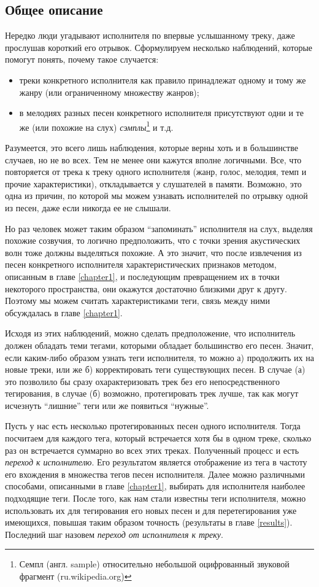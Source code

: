 \subsection{Общее описание}

Нередко люди угадывают исполнителя по впервые услышанному треку, даже прослушав короткий его отрывок.
Сформулируем несколько наблюдений, которые помогут понять, почему такое случается:
\begin{itemize}
 \item треки конкретного исполнителя как правило принадлежат одному и тому же жанру (или ограниченному множеству жанров);
 \item в мелодиях разных песен конкретного исполнителя присутствуют одни и те же (или похожие на слух) \emph{сэмплы}\footnote{Семпл (англ. sample) \ld 
 относительно небольшой оцифрованный звуковой фрагмент (ru.wikipedia.org)} и т.д.
\end{itemize}
Разумеется, это всего лишь наблюдения, которые верны хоть и в большинстве случаев, но не во всех. Тем не менее они кажутся вполне логичными.
Все, что повторяется от трека к треку одного исполнителя (жанр, голос, мелодия, темп и прочие характеристики), откладывается у слушателей в памяти.
Возможно, это одна из причин, по которой мы можем узнавать исполнителей по отрывку одной из песен, даже если никогда ее не слышали.

Но раз человек может таким образом ``запоминать'' исполнителя на слух, выделяя похожие созвучия, то логично предположить, что с точки зрения акустических волн тоже должны выделяться похожие.
А это значит, что после извлечения из песен конкретного исполнителя  характеристических признаков методом, описанным в главе \ref{chapter1}, 
и последующим превращением их в точки некоторого пространства, они окажутся достаточно близкими друг к другу. 
Поэтому мы можем считать характеристиками теги, связь между ними обсуждалась в главе \ref{chapter1}.

Исходя из этих наблюдений, можно сделать предположение, что исполнитель должен обладать теми тегами, которыми обладает большинство его песен.
Значит, если каким-либо образом узнать теги исполнителя, то можно а) продолжить их на новые треки, или же б) корректировать теги существующих песен.
В случае (а) это позволило бы сразу охарактеризовать трек без его непосредственного тегирования, в случае (б) \ld возможно, 
протегировать трек лучше, так как могут исчезнуть ``лишние'' теги или же появиться ``нужные''.

Пусть у нас есть несколько протегированных песен одного исполнителя. Тогда посчитаем для каждого тега, который встречается хотя бы в одном треке, сколько раз он встречается суммарно во всех этих треках.
Полученный процесс и есть \emph{переход к исполнителю}. Его результатом является отображение из тега в частоту его вхождения в множества тегов песен исполнителя. 
Далее можно различными способами, описанными в главе \ref{chapter1}, выбирать для исполнителя наиболее подходящие теги. После того, как нам стали известны теги исполнителя, можно использовать их для 
тегирования его новых песен и для перетегирования уже имеющихся, повышая таким образом точность (результаты в главе \ref{results}). Последний шаг назовем \emph{переход от исполнителя к треку}.

